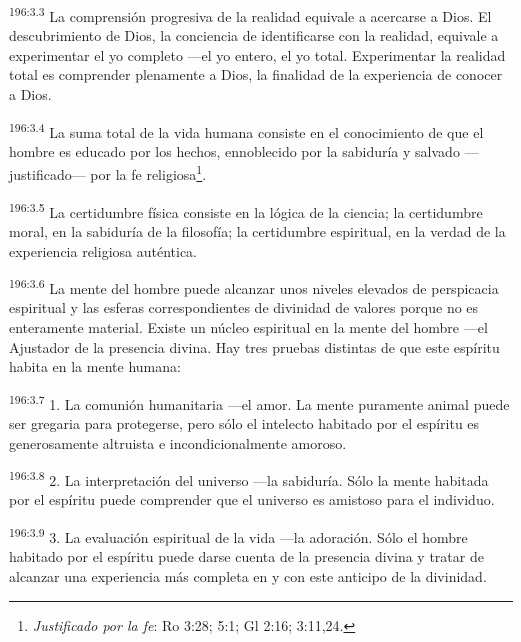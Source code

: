 \par 
\textsuperscript{196:3.3} La comprensión progresiva de la realidad equivale a acercarse a Dios. El descubrimiento de Dios, la conciencia de identificarse con la realidad, equivale a experimentar el yo completo ---el yo entero, el yo total. Experimentar la realidad total es comprender plenamente a Dios, la finalidad de la experiencia de conocer a Dios.

\par 
\textsuperscript{196:3.4} La suma total de la vida humana consiste en el conocimiento de que el hombre es educado por los hechos, ennoblecido por la sabiduría y salvado ---justificado--- por la fe religiosa\footnote{\textit{Justificado por la fe}: Ro 3:28; 5:1; Gl 2:16; 3:11,24.}.

\par 
\textsuperscript{196:3.5} La certidumbre física consiste en la lógica de la ciencia; la certidumbre moral, en la sabiduría de la filosofía; la certidumbre espiritual, en la verdad de la experiencia religiosa auténtica.

\par 
\textsuperscript{196:3.6} La mente del hombre puede alcanzar unos niveles elevados de perspicacia espiritual y las esferas correspondientes de divinidad de valores porque no es enteramente material. Existe un núcleo espiritual en la mente del hombre ---el Ajustador de la presencia divina. Hay tres pruebas distintas de que este espíritu habita en la mente humana:

\par 
\textsuperscript{196:3.7} 1. La comunión humanitaria ---el amor. La mente puramente animal puede ser gregaria para protegerse, pero sólo el intelecto habitado por el espíritu es generosamente altruista e incondicionalmente amoroso.

\par 
\textsuperscript{196:3.8} 2. La interpretación del universo ---la sabiduría. Sólo la mente habitada por el espíritu puede comprender que el universo es amistoso para el individuo.

\par 
\textsuperscript{196:3.9} 3. La evaluación espiritual de la vida ---la adoración. Sólo el hombre habitado por el espíritu puede darse cuenta de la presencia divina y tratar de alcanzar una experiencia más completa en y con este anticipo de la divinidad.


